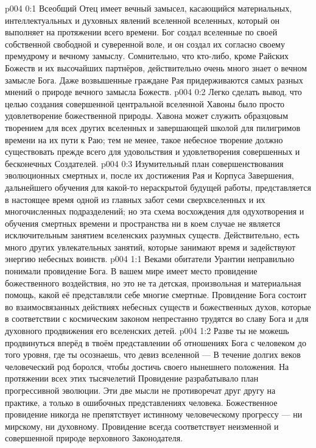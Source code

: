 \author{Божественный Советник}
\vs p004 0:1 Всеобщий Отец имеет вечный замысел, касающийся материальных, интеллектуальных и духовных явлений вселенной вселенных, который он выполняет на протяжении всего времени. Бог создал вселенные по своей собственной свободной и суверенной воле, и он создал их согласно своему премудрому и вечному замыслу. Сомнительно, что кто\hyp{}либо, кроме Райских Божеств и их высочайших партнёров, действительно очень много знает о вечном замысле Бога. Даже возвышенные граждане Рая придерживаются самых разных мнений о природе вечного замысла Божеств.
\vs p004 0:2 Легко сделать вывод, что целью создания совершенной центральной вселенной Хавоны было просто удовлетворение божественной природы. Хавона может служить образцовым творением для всех других вселенных и завершающей школой для пилигримов времени на их пути к Раю; тем не менее, такое небесное творение должно существовать прежде всего для удовольствия и удовлетворения совершенных и бесконечных Создателей.
\vs p004 0:3 Изумительный план совершенствования эволюционных смертных и, после их достижения Рая и Корпуса Завершения, дальнейшего обучения для какой\hyp{}то нераскрытой будущей работы, представляется в настоящее время одной из главных забот семи сверхвселенных и их многочисленных подразделений; но эта схема восхождения для одухотворения и обучения смертных времени и пространства ни в коем случае не является исключительным занятием вселенских разумных существ. Действительно, есть много других увлекательных занятий, которые занимают время и задействуют энергию небесных воинств.
\vs p004 1:1 Веками обитатели Урантии неправильно понимали провидение Бога. В вашем мире имеет место провидение божественного воздействия, но это не та детская, произвольная и материальная помощь, какой её представляли себе многие смертные. Провидение Бога состоит во взаимосвязанных действиях небесных существ и божественных духов, которые в соответствии с космическим законом непрестанно трудятся во славу Бога и для духовного продвижения его вселенских детей.
\vs p004 1:2 Разве ты не можешь продвинуться вперёд в твоём представлении об отношениях Бога с человеком до того уровня, где ты осознаешь, что девиз вселенной ---  В течение долгих веков человеческий род боролся, чтобы достичь своего нынешнего положения. На протяжении всех этих тысячелетий Провидение разрабатывало план прогрессивной эволюции. Эти две мысли не противоречат друг другу на практике, а только в ошибочных представлениях человека. Божественное провидение никогда не препятствует истинному человеческому прогрессу --- ни мирскому, ни духовному. Провидение всегда соответствует неизменной и совершенной природе верховного Законодателя.
